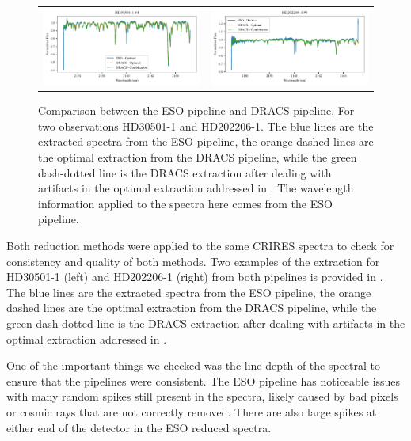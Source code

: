 \begin{figure}
\begin{tabular}{cc}
        \includegraphics[width=0.5\linewidth]{figures/reduction/pipeline_compare/pipeline_compare_HD30501-1_chip_4} & \includegraphics[width=0.5\linewidth]{figures/reduction/pipeline_compare/pipeline_compare_HD202206-1_chip_4}\\
    \end{tabular}
    \caption{Comparison between the ESO pipeline and DRACS pipeline. For two observations HD30501-1 and HD202206-1. The blue lines are the extracted spectra from the ESO pipeline, the orange dashed lines are the optimal extraction from the DRACS pipeline, while the green dash-dotted line is the DRACS extraction after dealing with artifacts in the optimal extraction addressed in . The wavelength information applied to the spectra here comes from the ESO pipeline.}
    \label{fig:reduction-comparsion}
\end{figure}

Both reduction methods were applied to the same CRIRES spectra to check for consistency and quality of both methods. Two examples of the extraction for HD30501-1 (left) and HD202206-1 (right) from both pipelines is provided in . The blue lines are the extracted spectra from the ESO pipeline, the orange dashed lines are the optimal extraction from the DRACS pipeline, while the green dash-dotted line is the DRACS extraction after dealing with artifacts in the optimal extraction addressed in . 

One of the important things we checked was the line depth of the spectral to ensure that the pipelines were consistent. The ESO pipeline has noticeable issues with many random spikes still present in the spectra, likely caused by bad pixels or cosmic rays that are not correctly removed. There are also large spikes at either end of the detector in the ESO reduced spectra.  

